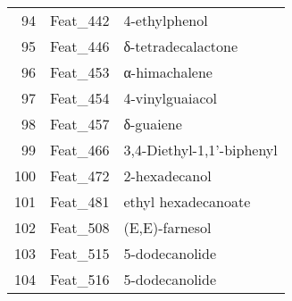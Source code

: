 \begin{table}[ht]
\begin{tabular}{rll}
  94 & Feat\_442 & 4-ethylphenol \\ 
  95 & Feat\_446 & δ-tetradecalactone \\ 
  96 & Feat\_453 & α-himachalene \\ 
  97 & Feat\_454 & 4-vinylguaiacol \\ 
  98 & Feat\_457 & δ-guaiene \\ 
  99 & Feat\_466 & 3,4-Diethyl-1,1'-biphenyl \\ 
  100 & Feat\_472 & 2-hexadecanol \\ 
  101 & Feat\_481 & ethyl hexadecanoate \\ 
  102 & Feat\_508 & (E,E)-farnesol \\ 
  103 & Feat\_515 & 5-dodecanolide \\ 
  104 & Feat\_516 & 5-dodecanolide \\ 
   \hline
\end{tabular}
\end{table}

